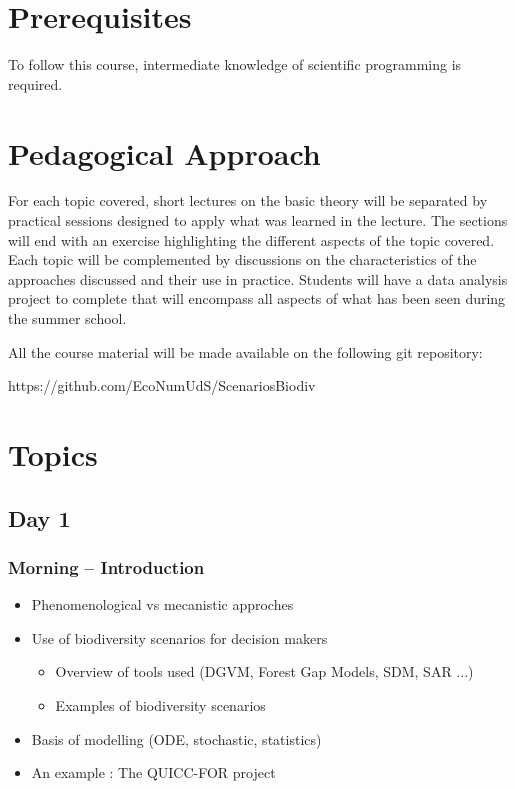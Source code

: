 \documentclass[12]{article}
\begin{document}
	\section*{Prerequisites}

  To follow this course, intermediate knowledge of scientific programming is
  required.


  \section*{Pedagogical Approach}

  For each topic covered, short lectures on the basic theory will be separated
  by practical sessions designed to apply what was learned in the lecture. The
  sections will end with an exercise highlighting the different aspects of the
  topic covered. Each topic will be complemented by discussions on the
  characteristics of the approaches discussed and their use in practice.
  Students will have a data analysis project to complete that will encompass all
  aspects of what has been seen during the summer school.

  All the course material will be made available on the following git
  repository:

  https://github.com/EcoNumUdS/ScenariosBiodiv

	\section*{Topics}

  \subsection*{Day 1}
  \subsubsection*{Morning -- Introduction}
  \begin{itemize}
    \item Phenomenological vs mecanistic approches
    \item Use of biodiversity scenarios for decision makers
    \begin{itemize}
      \item Overview of tools used (DGVM, Forest Gap Models, SDM, SAR ...)
      \item Examples of biodiversity scenarios
    \end{itemize}
    \item Basis of modelling (ODE, stochastic, statistics)
    \item An example : The QUICC-FOR project
  \end{itemize}
\end{document}
